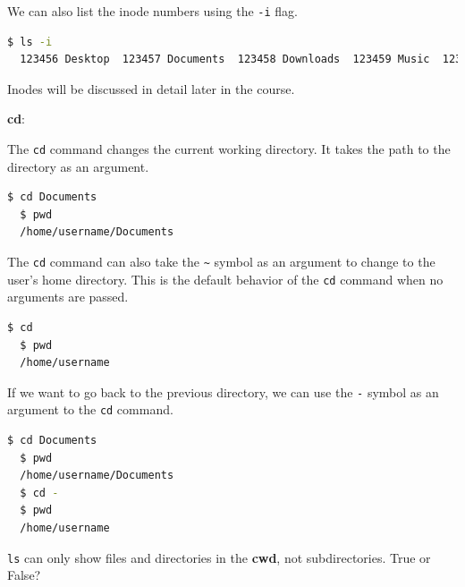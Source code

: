 We can also list the inode numbers
using the \texttt{-i} flag.

\begin{lstlisting}[language=bash]
  $ ls -i
  123456 Desktop  123457 Documents  123458 Downloads  123459 Music  123460 Pictures  123461 Videos
\end{lstlisting}

Inodes will be discussed in detail later in the course.

\textbf{cd}:

The \texttt{cd} command changes the current working directory. It takes the path to the directory as an argument.

\begin{lstlisting}[language=bash]
  $ cd Documents
  $ pwd
  /home/username/Documents
\end{lstlisting}

The \texttt{cd} command can also take the \texttt{\textasciitilde} symbol as an argument to change to the user's home directory.
This is the default behavior of the \texttt{cd} command when no arguments are passed.

\begin{lstlisting}[language=bash]
  $ cd
  $ pwd
  /home/username
\end{lstlisting}

If we want to go back to the previous directory, we can use the \texttt{-} symbol as an argument to the \texttt{cd} command.

\begin{lstlisting}[language=bash]
  $ cd Documents
  $ pwd
  /home/username/Documents
  $ cd -
  $ pwd
  /home/username
\end{lstlisting}


\begin{qs}
  \texttt{ls} can only show files and directories in the \textbf{cwd}, not subdirectories.
  True or False?
\end{qs}

